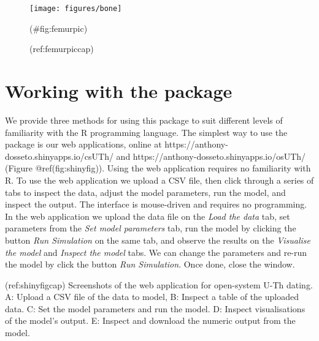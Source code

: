 \documentclass[]{elsarticle} %
\begin{document}
\begin{figure}
\texttt{[image: figures/bone]} \caption{(ref:femurpiccap)}(\#fig:femurpic)
\end{figure}

\FloatBarrier

\hypertarget{working-with-the-package}{%
\section{Working with the package}\label{working-with-the-package}}

We provide three methods for using this package to suit different levels of familiarity with the R programming language. The simplest way to use the package is our web applications, online at https://anthony-dosseto.shinyapps.io/csUTh/ and https://anthony-dosseto.shinyapps.io/osUTh/ (Figure @ref(fig:shinyfig)). Using the web application requires no familiarity with R. To use the web application we upload a CSV file, then click through a series of tabs to inspect the data, adjust the model parameters, run the model, and inspect the output. The interface is mouse-driven and requires no programming. In the web application we upload the data file on the \emph{Load the data} tab, set parameters from the \emph{Set model parameters} tab, run the model by clicking the button \emph{Run Simulation} on the same tab, and observe the results on the \emph{Visualise the model} and \emph{Inspect the model} tabs. We can change the parameters and re-run the model by click the button \emph{Run Simulation}. Once done, close the window.

(ref:shinyfigcap) Screenshots of the web application for open-system U-Th dating. A: Upload a CSV file of the data to model, B: Inspect a table of the uploaded data. C: Set the model parameters and run the model. D: Inspect visualisations of the model's output. E: Inspect and download the numeric output from the model.
\end{document}
